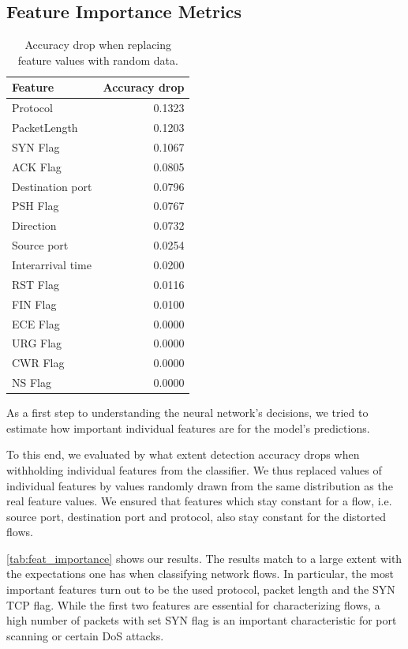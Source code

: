 \documentclass[sigconf,nonacm]{acmart}
\begin{document}
\subsection{Feature Importance Metrics}
\begin{table}
\caption{Accuracy drop when replacing feature values with random data.}
\label{tab:feat_importance}
\begin{tabular}{l r}
\toprule
Feature & Accuracy drop \\ \midrule
Protocol	&	0.1323	\\
PacketLength	&	0.1203	\\
SYN Flag	&	0.1067	\\
ACK Flag	&	0.0805	\\
Destination port	&	0.0796	\\
PSH Flag	&	0.0767	\\
Direction	&	0.0732	\\
Source port	&	0.0254	\\
Interarrival time	&	0.0200	\\
RST Flag	&	0.0116	\\
FIN Flag	&	0.0100	\\
ECE	Flag &	0.0000	\\
URG Flag	&	0.0000	\\
CWR Flag	&	0.0000	\\
NS Flag	&	0.0000	\\
\bottomrule
\end{tabular}
\end{table}
As a first step to understanding the neural network's decisions, we tried to estimate how important individual features are for the model's predictions. 

To this end, we evaluated by what extent detection accuracy drops when withholding individual features from the classifier. We thus replaced values of individual features by values randomly drawn from the same distribution as the real feature values. We ensured that features which stay constant for a flow, i.e. source port, destination port and protocol, also stay constant for the distorted flows.

\autoref{tab:feat_importance} shows our results. The results match to a large extent with the expectations one has when classifying network flows. In particular,  the most important features turn out to be the used protocol, packet length and the SYN TCP flag. While the first two features are essential for characterizing flows, a high number of packets with set SYN flag is an important characteristic for port scanning or certain DoS attacks. 
\end{document}
